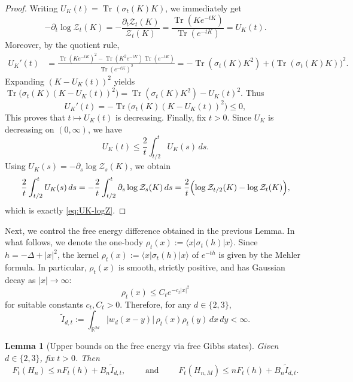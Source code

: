 \documentclass[11pt]{amsart}
\newcommand{\1}{\mathbbm{1}}
\newcommand{\Tr}{\operatorname{Tr}}
\theoremstyle{plain}
\newtheorem{lemma}[theorem]{Lemma}
\theoremstyle{definition}
\theoremstyle{remark}
\numberwithin{equation}{section}
\begin{document}
\begin{proof}
Writing $U_K(t)=\Tr(\sigma_t(K)K)$,
we immediately get
\[
-\partial_t\log \mathcal Z_t(K)
=
-\frac{\partial_t\mathcal Z_t(K)}{\mathcal Z_t(K)}
=
\frac{\Tr(Ke^{-tK})}{\Tr(e^{-tK})}
=
U_K(t).
\]
Moreover, by the quotient rule,
\begin{align}
U_K'(t)
&=
\frac{\Tr(Ke^{-tK})^2-\Tr(K^2e^{-tK})\Tr(e^{-tK})}{\Tr(e^{-tK})^2}=
-\Tr(\sigma_{t}(K)K^2)+\bigl(\Tr(\sigma_{t}(K)K)\bigr)^2.
\end{align}
 Expanding \((K-U_K(t))^2\) yields $\Tr\bigl(\sigma_{t}(K)(K-U_K(t))^2\bigr)
=
\Tr(\sigma_{t}(K)K^2)-U_K(t)^2$. Thus
\[
U_K'(t)
=
-\Tr\bigl(\sigma_{t}(K)(K-U_K(t))^2\bigr)\le 0,
\]
This proves that \(t\mapsto U_K(t)\) is decreasing. Finally, fix \(t>0\). Since \(U_K\) is decreasing on \((0,\infty)\), we have
\[
U_K(t)\le \frac{2}{t}\int_{t/2}^t U_K(s)\,ds.
\]
Using \(U_K(s)=-\partial_s\log \mathcal Z_s(K)\), we obtain
\[
\frac{2}{t}\int_{t/2}^t U_K(s)\,ds
=
-\frac{2}{t}\int_{t/2}^t \partial_s\log \mathcal Z_s(K)\,ds
=
\frac{2}{t}\Bigl(\log \mathcal Z_{t/2}(K)-\log \mathcal Z_t(K)\Bigr),
\]
which is exactly \eqref{eq:UK-logZ}.
\end{proof}
\noindent Next, we control the free energy difference obtained in the previous Lemma. In what follows, we
denote the one-body $\rho_t(x):=\langle x|\sigma_t(h)|x\rangle$. Since \(h=-\Delta+|x|^2\), the kernel $\rho_t(x):=\langle x|\sigma_t(h)|x\rangle$ of \(e^{-th}\) is given by the Mehler formula. In particular, \(\rho_t(x)\) is smooth, strictly positive, and has Gaussian decay as \(|x|\to\infty\):
\[
\rho_t(x)\le C_t e^{-c_t|x|^2}
\]
for suitable constants \(c_t,C_t>0\). Therefore, for any $d\in\{2,3\}$,
\[
\widetilde I_{d,t}
:=
\int_{\mathbb R^{2d}}|w_d(x-y)|\,\rho_t(x)\rho_t(y)\,dx\,dy<\infty.
\]

\begin{lemma}[Upper bounds on the free energy via free Gibbs states]
\label{lem:lower-bound-partition-gibbs}Given $d\in\{2,3\}$, fix $t>0$. Then
\begin{equation}
\label{eq:lower-ZN-lemma}
F_t(H_n)\le nF_t(h)+B_n\widetilde I_{d,t},
\qquad \text{ and }\qquad 
F_t(H_{n,M})\le nF_t(h)+B_n\widetilde I_{d,t}.
\end{equation}
\end{lemma}
\end{document}

